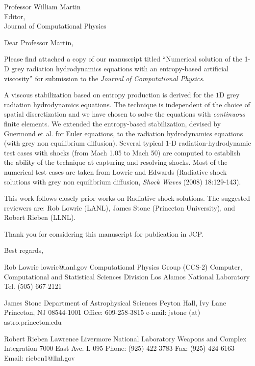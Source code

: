 \begin{letter}{Professor William Martin\\
    Editor,\\
    Journal of Computational Physics}
\date{\today}

\opening{Dear Professor Martin,}
         \vspace{0.25cm}

Please find attached a copy of our manuscript titled ``Numerical solution of the 1-D grey radiation hydrodynamics equations with an entropy-based artificial viscosity'' for submission to the {\em Journal of Computational Physics}. 

A viscous stabilization based on entropy production is derived for the $1$D grey radiation hydrodynamics equations. The technique is independent of the choice of spatial discretization and we have chosen to solve the equations with {\em continuous} finite elements. 
We extended the entropy-based stabilization, devised by Guermond et al. for Euler equations, to the radiation hydrodynamics equations (with grey non equilibrium diffusion).  Several typical 1-D radiation-hydrodynamic test cases with shocks (from Mach 1.05 to Mach 50) are computed to establish the ability of the technique at capturing and resolving shocks. Most of the numerical test cases are taken from Lowrie and Edwards (Radiative shock solutions with grey non equilibrium diffusion, {\it Shock Waves} (2008) 18:129-143).

 
This work follows closely prior works on Radiative shock solutions. The suggested reviewers are: Rob Lowrie (LANL), James Stone (Princeton University), and Robert Rieben (LLNL).
 

Thank you for considering this manuscript for publication in JCP.




\closing{Best regards, }

\end{letter}


Rob Lowrie
lowrie@lanl.gov
Computational Physics Group (CCS-2)
Computer, Computational and Statistical Sciences Division Los Alamos National Laboratory Tel. (505) 667-2121

James Stone
Department of Astrophysical Sciences
Peyton Hall, Ivy Lane
Princeton, NJ 08544-1001
Office: 609-258-3815
e-mail: jstone (at) astro.princeton.edu 

Robert Rieben
Lawrence Livermore National Laboratory
Weapons and Complex Integration
7000 East Ave. L-095
Phone: (925) 422-3783
Fax: (925) 424-6163
Email: rieben1@llnl.gov
